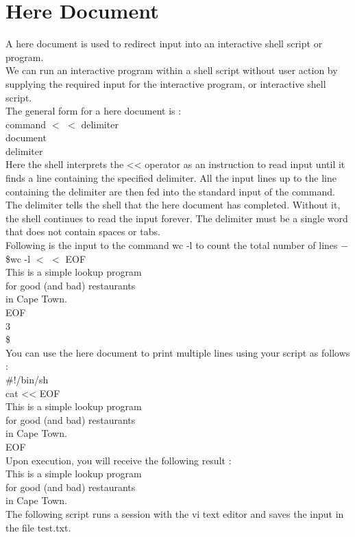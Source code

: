 \documentclass{article}
\begin{document}
\section*{Here Document}
A here document is used to redirect input into an interactive shell script or program.\\
We can run an interactive program within a shell script without user action by supplying the required input for the interactive program, or interactive shell script.\\
The general form for a here document is :\\
command $<$ $<$ delimiter\\
document\\
delimiter\\
Here the shell interprets the << operator as an instruction to read input until it finds a line containing the specified delimiter. All the input lines up to the line containing the delimiter are then fed into the standard input of the command.\\
The delimiter tells the shell that the here document has completed. Without it, the shell continues to read the input forever. The delimiter must be a single word that does not contain spaces or tabs.\\
Following is the input to the command wc -l to count the total number of lines −
\$wc -l $<$ $<$ EOF\\
   This is a simple lookup program \\
	for good (and bad) restaurants\\
	in Cape Town.\\
EOF\\
3\\
\$\\
You can use the here document to print multiple lines using your script as follows :\\
\#!/bin/sh\\
cat << EOF\\
This is a simple lookup program \\
for good (and bad) restaurants\\
in Cape Town.\\
EOF	\\
Upon execution, you will receive the following result :\\
This is a simple lookup program\\
for good (and bad) restaurants\\
in Cape Town.\\
The following script runs a session with the vi text editor and saves the input in the file test.txt.\\
\end{document}
